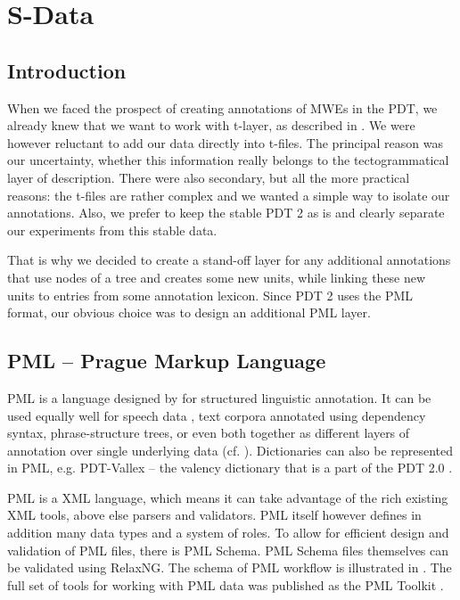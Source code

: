 
\chapter{S-Data}
\label{sec:s}


\section{Introduction}
\label{sec:s:intro}
When we faced the prospect of creating annotations of MWEs in the PDT, we already knew that we want to work with t-layer, as described in . We were however reluctant to add our data directly into t-files. The principal reason was our uncertainty, whether this information really belongs to the tectogrammatical layer of description. There were also secondary, but all the more practical reasons: the t-files are rather complex and we wanted a simple way to isolate our annotations. Also, we prefer to keep the stable PDT 2 as is and clearly separate our experiments from this stable data. 

That is why we decided to create a stand-off layer for any additional annotations that use nodes of a tree and creates some new units, while linking these new units to entries from some annotation lexicon. Since PDT 2 uses the PML format, our obvious choice was to design an additional PML layer.



\section{PML -- Prague Markup Language}
\label{sec:pml}
PML is a language designed by \citet{pajas:2005} for structured linguistic annotation. It can be used equally well for speech data \citep{hajic:2008}, text corpora annotated using dependency syntax, phrase-structure trees, or even both together as different layers of annotation over single underlying data (cf. \citealp{cinkova:2009}). Dictionaries can also be represented in PML, e.g. PDT-Vallex -- the valency dictionary that is a part of the PDT 2.0 \citep{pdtvallex:2003a}.

PML is a XML language, which means it can take advantage of the rich existing XML tools, above else parsers and validators. PML itself however defines in addition many data types and a system of roles. To allow for efficient design and validation of PML files, there is PML Schema. PML Schema files themselves can be validated using RelaxNG. The schema of PML workflow is illustrated in . The full set of tools for working with PML data was published as the PML Toolkit \citep{pajas:2009}.

